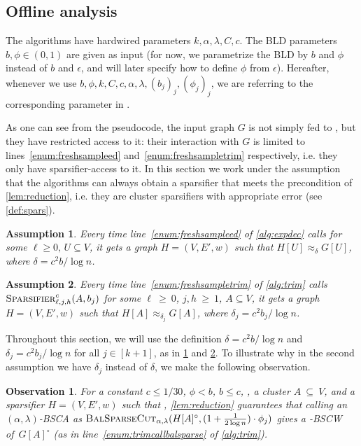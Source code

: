 \documentclass[epsfig,letter,11pt]{article}
\numberwithin{equation}{section}
\newcommand{\bsc}{\textsc{BalSparseCut}_{\alpha,\lambda}}
\newtheorem{obs}[theorem]{Observation}
\newtheorem{assump}{Assumption}
\begin{document}
\subsection{Offline analysis}
\label{subsec:offline}
The algorithms have hardwired parameters $k,\alpha,\lambda,C,c$. The BLD parameters $b,\phi \in (0,1)$ are given as input (for now, we parametrize the BLD by $b$ and $\phi$ instead of $b$ and $\epsilon$, and will later specify how to define $\phi$ from $\epsilon$).
Hereafter, whenever we use $b,\phi,k,C,c,\alpha,\lambda,(b_j)_{j},(\phi_j)_{j}$, we are referring to the corresponding parameter in .

As one can see from the pseudocode, the input graph $G$ is not simply fed to , but  they have restricted access to it: their interaction with $G$ is limited to lines~\eqref{enum:freshsampleed} and~\eqref{enum:freshsampletrim} respectively, i.e. they only have sparsifier-access to it. In this section we work under the assumption that the algorithms can always obtain a sparsifier that meets the precondition of \cref{lem:reduction}, i.e. they are cluster sparsifiers  with appropriate error (see \cref{def:spars}).

\begin{assump}
	\label{assump:sparsifiers1}
	Every time line~\eqref{enum:freshsampleed} of \cref{alg:expdec} calls  for some $\ell \ge 0,\, U \subseteq V$, it gets a graph $H=(V,E',w)$ such that $H[U] \approx_\delta G[U]$, where $\delta = c^2b/\log n$.
\end{assump}

\begin{assump}
	\label{assump:sparsifiers2}
	Every time line~\eqref{enum:freshsampletrim} of \cref{alg:trim} calls $\textsc{Sparsifier}^c_{\ell,j,h}(A,b_j)$ for some $\ell~\ge~0$, $j,h~\ge~1$, $A \subseteq V$, it gets a graph $H=(V,E',w)$ such that $H[A] \approx_{\delta_j} G[A]$, where $\delta_j = c^2b_j/\log n$.
\end{assump}

\noindent
Throughout this section, we will use the definition $\delta=c^2b/\log n$ and  $\delta_j = c^2b_j/\log n$ for all $j \in [k+1]$, as in \cref{assump:sparsifiers1} and \cref{assump:sparsifiers2}. To illustrate why in the second assumption we have $\delta_j$ instead of $\delta$, we make the following observation.
\begin{obs}
	\label{rmk:bsctrim}
	For  a constant $c \le 1/30$, $\phi < b$, $b \le c$, , a cluster $A~\subseteq~V$, and a sparsifier  $H=(V,E',w)$ such that , \cref{lem:reduction} guarantees that calling an $(\alpha,\lambda)$-BSCA as $\bsc(H[A]^\circ, (1+\frac{1}{2\log n}) \cdot \phi_j)$ gives a -BSCW of~$G[A]^\circ$  (as in line~\eqref{enum:trimcallbalsparse} of \cref{alg:trim}).
\end{obs}
\end{document}
